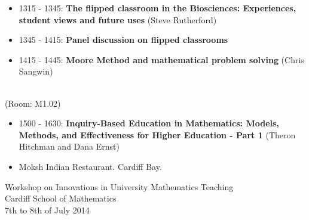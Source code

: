 \documentclass[a4paper]{article}
\begin{document}
\begin{itemize}
    \item 1315 - 1345: \textbf{The flipped classroom in the Biosciences: Experiences, student views and future uses} (Steve Rutherford)
    \item 1345 - 1415: \textbf{Panel discussion on flipped classrooms}
    \item 1415 - 1445: \textbf{Moore Method and mathematical problem solving} (Chris Sangwin)
\end{itemize}

\vspace{1cm}

\begin{center}
    \\
    \tiny{(Room: M1.02)}
\end{center}

\begin{itemize}
    \item 1500 - 1630: \textbf{Inquiry-Based Education in Mathematics: Models, Methods, and Effectiveness for Higher Education - Part 1} (Theron Hitchman and Dana Ernst)
\end{itemize}

\vspace{1cm}

\begin{center}
\end{center}

\begin{itemize}
    \item Moksh Indian Restaurant. Cardiff Bay.
\end{itemize}



\newpage

\begin{center}
    {\Huge Workshop on Innovations in University Mathematics Teaching}\\
    {\tiny Cardiff School of Mathematics}\\
    {\tiny 7th to 8th of July 2014}\\
    \vspace{1cm}
    {}\\
\end{center}

\vspace{1cm}
\end{document}
